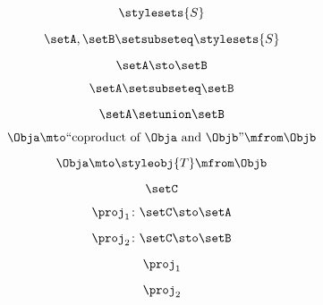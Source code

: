{\begin{forslides}
    \begin{equation}
        \label{eq:parallelism-144}
        \stylesets{S}
    \end{equation}

    \begin{equation}
        \label{eq:parallelism-145}
        \setA,\setB\setsubseteq \stylesets{S}
    \end{equation}

    \begin{equation}
        \label{eq:parallelism-146}
        \setA \sto \setB
    \end{equation}

    \begin{equation}
        \label{eq:parallelism-147}
        \setA\setsubseteq \setB
    \end{equation}

    \begin{equation}
        \label{eq:parallelism-148}
        \setA\setunion\setB
    \end{equation}

    \begin{equation}
        \label{eq:parallelism-149}
        \Obja \mto \text{``coproduct of } \Obja \text{ and } \Objb \text{''}  \mfrom \Objb
    \end{equation}

    \begin{equation}
        \label{eq:parallelism-150}
        \Obja \mto \styleobj{T} \mfrom \Objb
    \end{equation}

    \begin{equation}
        \label{eq:parallelism-151}
        \setC
    \end{equation}

    \begin{equation}
        \label{eq:parallelism-152}
        \proj_1\colon \setC \sto \setA
    \end{equation}

    \begin{equation}
        \label{eq:parallelism-153}
        \proj_2\colon \setC \sto \setB
    \end{equation}

    \begin{equation}
        \label{eq:parallelism-154}
        \proj_1
    \end{equation}

    \begin{equation}
        \label{eq:parallelism-155}
        \proj_2
    \end{equation}


\end{forslides}}
